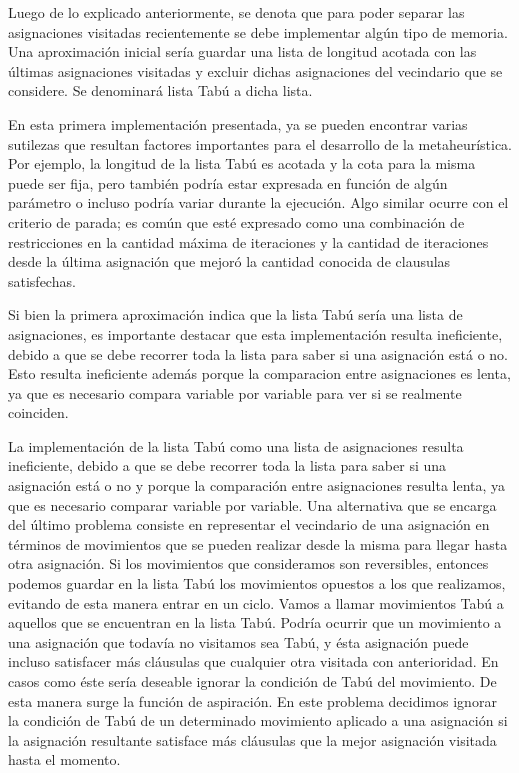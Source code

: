 \documentclass[a4paper,10pt]{article}
\begin{document}
Luego de lo explicado anteriormente, se denota que para poder separar las asignaciones visitadas recientemente se debe implementar alg\'un tipo de memoria. Una aproximaci\'on inicial ser\'ia guardar una lista de longitud acotada con las \'ultimas asignaciones visitadas y excluir dichas asignaciones del vecindario que se considere. Se denominar\'a lista Tab\'u a dicha lista.

En esta primera implementaci\'on presentada, ya se pueden encontrar varias sutilezas que resultan factores importantes para el desarrollo de la metaheur\'istica. Por ejemplo, la longitud de la lista Tab\'u es acotada y la cota para la misma puede ser fija, pero tambi\'en podr\'ia estar expresada en funci\'on de alg\'un par\'ametro o incluso podr\'ia variar durante la ejecuci\'on. Algo similar ocurre con el criterio de parada; es com\'un que est\'e expresado como una combinaci\'on de restricciones en la cantidad m\'axima de iteraciones y la cantidad de iteraciones desde la \'ultima asignaci\'on que mejor\'o la cantidad conocida de clausulas satisfechas.

Si bien la primera aproximaci\'on indica que la lista Tab\'u ser\'ia una lista de asignaciones, es importante destacar que esta implementaci\'on resulta ineficiente, debido a que se debe recorrer toda la lista para saber si una asignaci\'on est\'a o no. Esto resulta ineficiente adem\'as porque la comparacion entre asignaciones es lenta, ya que es necesario compara variable por variable para ver si se realmente coinciden.


La implementación de la lista Tabú como una lista de asignaciones resulta ineficiente, debido a que se debe recorrer toda la lista para saber si una asignación está o no y porque la comparación entre asignaciones resulta lenta, ya que es necesario comparar variable por variable. 
Una alternativa que se encarga del último problema consiste en representar el vecindario de una asignación en términos de movimientos que se pueden realizar desde la misma para llegar hasta otra asignación. Si los movimientos que consideramos son reversibles, entonces podemos guardar en la lista Tabú los movimientos opuestos a los que realizamos, evitando de esta manera entrar en un ciclo. Vamos a llamar movimientos Tabú a aquellos que se encuentran en la lista Tabú.
Podría ocurrir que un movimiento a una asignación que todavía no visitamos sea Tabú, y ésta asignación puede incluso satisfacer más cláusulas que cualquier otra visitada con anterioridad. En casos como éste sería deseable ignorar la condición de Tabú del movimiento. De esta manera surge la función de aspiración. En este problema decidimos ignorar la condición de Tabú de un determinado movimiento aplicado a una asignación si la asignación resultante satisface más cláusulas que la mejor asignación visitada hasta el momento.
\end{document}
